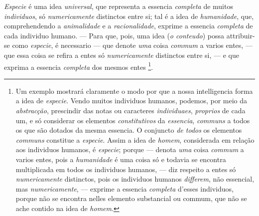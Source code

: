   
\emph{Especie} é uma idea \emph{universal}, que representa a essencia \emph{completa} de muitos \emph{individuos}, só \emph{numericamente} distinctos entre si; tal é a idea de \emph{humanidade}, que, comprehendendo a \emph{animalidade} e a \emph{racionalidade}, exprime a essencia \emph{completa} de cada individuo humano. --- Para que, pois, uma idea (\emph{o conteudo}) possa attribuir-se como \emph{especie}, é necessario --- que denote \emph{uma} coisa \emph{commum} a varios entes, --- que essa coisa se refira a entes só \emph{numericamente} distinctos entre si, --- e que exprima a essencia \emph{completa} dos mesmos entes \footnote{Um exemplo mostrará claramente o modo por que a nossa intelligencia forma a idea de \emph{especie}. Vendo muitos individuos humanos, podemos, por meio da \emph{abstracção}, prescindir das notas ou caracteres \emph{individuaes}, \emph{proprios} de cada um, e só considerar os elementos \emph{constitutivos} da \emph{essencia}, \emph{communs} a todos os que são dotados da mesma essencia. O conjuncto \emph{de todos} os elementos \emph{communs} constitue a \emph{especie}. Assim a idea de \emph{homem}, considerada em relação aos individuos humanos, é \emph{especie}; porque --- denota \emph{uma} coisa \emph{commum} a varios entes, pois a \emph{humanidade} é uma coisa só e todavia se encontra multiplicada em todos os individuos humanos, --- diz respeito a entes só \emph{numericamente} distinctos, pois os individuos humanos \emph{differem}, não essencial, mas \emph{numericamente}, --- exprime a essencia \emph{completa} d'esses individuos, porque não se encontra nelles elemento substancial ou commum, que não se ache contido na idea de \emph{homem}.}.


